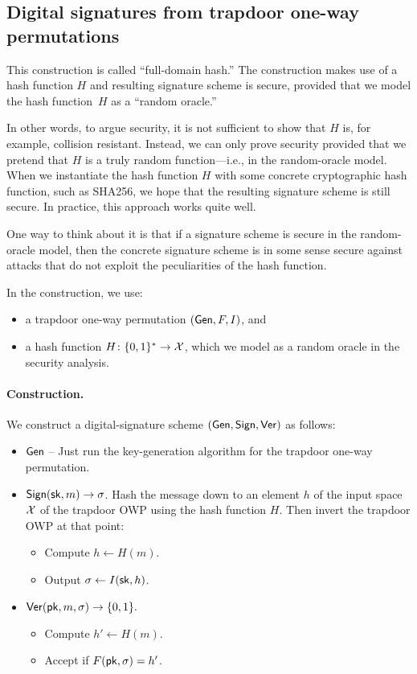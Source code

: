 \subsection{Digital signatures from trapdoor one-way permutations}

This construction is called ``full-domain hash.''\autocite{BR93}
The construction makes use of a hash function $H$ and resulting
signature scheme is secure, provided that we model the hash function~$H$
as a ``random oracle.''

In other words, to argue security, it is not sufficient to show that
$H$ is, for example, collision resistant.
Instead, we can only prove security provided that we pretend that $H$
is a truly random function---i.e., in the random-oracle model.
When we instantiate the hash function $H$ with some concrete cryptographic
hash function, such as SHA256, we hope that the resulting signature
scheme is still secure.
In practice, this approach works quite well.

One way to think about it is that if a signature scheme is secure
in the random-oracle model, then the concrete signature scheme
is in some sense secure against attacks that do not exploit the peculiarities
of the hash function.

\medskip 

In the construction, we use:
\begin{itemize}
  \item a trapdoor one-way permutation $(\mathsf{Gen}, F, I)$, and
  \item a hash function $H \colon \{0,1\}^* \to \mathcal{X}$,
        which we model as a random oracle in the
        security analysis.
\end{itemize}

\paragraph{Construction.}
We construct a digital-signature scheme $(\mathsf{Gen}, \mathsf{Sign}, \mathsf{Ver})$ as follows:
\begin{itemize}
  \item $\mathsf{Gen}$ -- Just run the key-generation algorithm for the
        trapdoor one-way permutation.
  \item $\mathsf{Sign}({\mathsf{sk}}, m) \to \sigma$.
        Hash the message down to an element $h$ of the input space $\mathcal{X}$
        of the trapdoor OWP using the hash function $H$. Then invert
        the trapdoor OWP at that point:
        \begin{itemize}
          \item Compute $h \gets H(m)$.
          \item Output $\sigma \gets I({\mathsf{sk}}, h)$.
        \end{itemize}
      \item $\mathsf{Ver}(\mathsf{pk}, m, \sigma) \to \{0,1\}.$ 
        \begin{itemize}
          \item Compute $h' \gets H(m)$.
          \item Accept if $F(\mathsf{pk}, \sigma) = h'$.
        \end{itemize}
\end{itemize}

